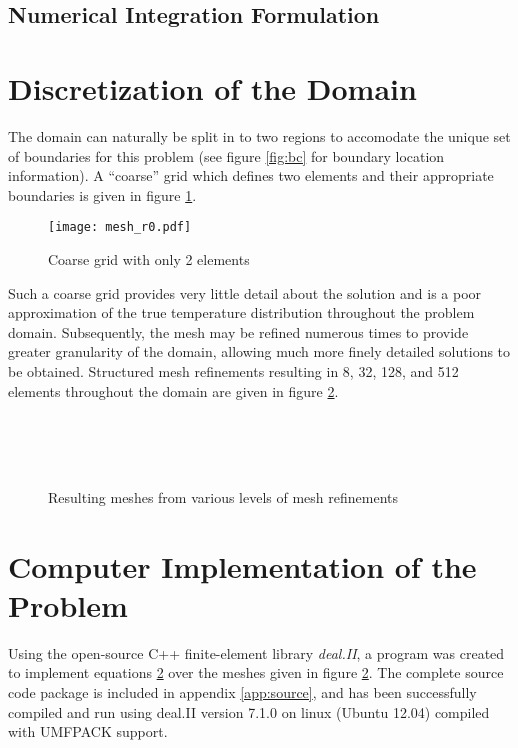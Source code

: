 \documentclass[letterpaper,10pt]{article}
\begin{document}
\subsection{Numerical Integration Formulation}

\section{Discretization of the Domain}
The domain can naturally be split in to two regions to accomodate the unique set of boundaries for this problem (see figure \ref{fig:bc} for boundary location information). A ``coarse'' grid which defines two elements and their appropriate boundaries is given in figure \ref{fig:grid_r0}.

\begin{figure}[H]
	\centering
	\texttt{[image: mesh\_r0.pdf]}
	\caption{Coarse grid with only 2 elements}
	\label{fig:grid_r0}
\end{figure}

Such a coarse grid provides very little detail about the solution and is a poor approximation of the true temperature distribution throughout the problem domain. Subsequently, the mesh may be refined numerous times to provide greater granularity of the domain, allowing much more finely detailed solutions to be obtained. Structured mesh refinements resulting in 8, 32, 128, and 512 elements throughout the domain are given in figure \ref{fig:meshs}.

\begin{figure}[H]
	\centering
	 \\
	 \\
	 \\
	\caption{Resulting meshes from various levels of mesh refinements}
	\label{fig:meshs}
\end{figure}

\section{Computer Implementation of the Problem}
Using the open-source C++ finite-element library \emph{deal.II}, a program was created to implement equations \ref{} over the meshes given in figure \ref{fig:meshs}. The complete source code package is included in appendix \ref{app:source}, and has been successfully compiled and run using deal.II version 7.1.0 on linux (Ubuntu 12.04) compiled with UMFPACK support.
\end{document}
